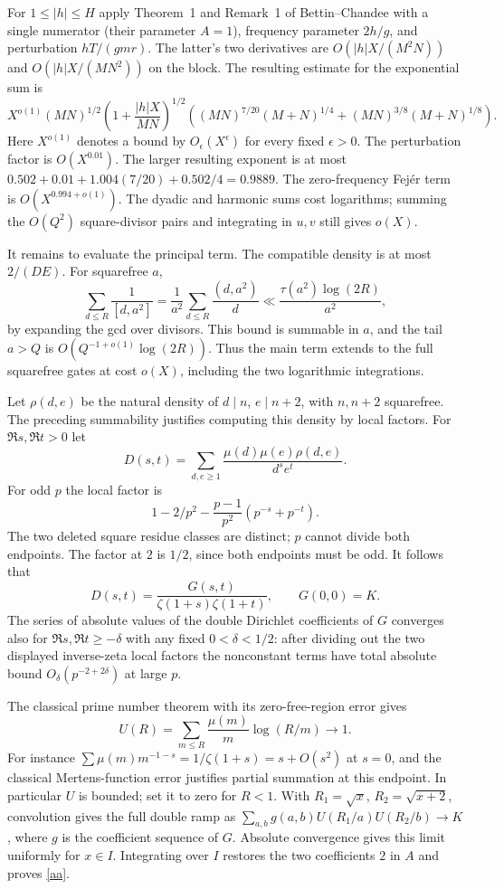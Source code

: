 \documentclass[11pt]{article}
\begin{document}
For $1\le |h|\le H$ apply Theorem~1 and Remark~1 of
Bettin--Chandee \cite{BC} with a single numerator (their parameter
$A=1$), frequency parameter $2h/g$, and perturbation $hT/(gmr)$.
The latter's two derivatives are
$O(|h|X/(M^2N))$ and $O(|h|X/(MN^2))$ on the block.
The resulting estimate for the exponential sum is
\[
 X^{o(1)}(MN)^{1/2}
 \left(1+\frac{|h|X}{MN}\right)^{1/2}
 \left((MN)^{7/20}(M+N)^{1/4}
              +(MN)^{3/8}(M+N)^{1/8}\right).
\]
Here $X^{o(1)}$ denotes a bound by $O_\epsilon(X^\epsilon)$
for every fixed $\epsilon>0$. The perturbation factor is
$O(X^{0.01})$. The larger resulting exponent is at most
$0.502+0.01+1.004(7/20)+0.502/4=0.9889$.
The zero-frequency Fej\'er term is $O(X^{0.994+o(1)})$.
The dyadic and harmonic sums cost logarithms; summing the $O(Q^2)$
square-divisor pairs and integrating in $u,v$ still gives $o(X)$.

It remains to evaluate the principal term. The compatible density
is at most $2/(DE)$. For squarefree $a$,
\[
 \sum_{d\le R}\frac1{[d,a^2]}
 =\frac1{a^2}\sum_{d\le R}\frac{(d,a^2)}d
 \ll\frac{\tau(a^2)\log(2R)}{a^2},
\]
by expanding the gcd over divisors. This bound is summable in $a$,
and the tail $a>Q$ is $O(Q^{-1+o(1)}\log(2R))$.
Thus the main term extends to the full squarefree gates at cost
$o(X)$, including the two logarithmic integrations.

Let $\rho(d,e)$ be the natural density of $d\mid n$, $e\mid n+2$,
with $n,n+2$ squarefree. The preceding summability justifies
computing this density by local factors. For $\Re s,\Re t>0$ let
\[
 D(s,t)=\sum_{d,e\ge1}\frac{\mu(d)\mu(e)\rho(d,e)}
                                    {d^s e^t}.
\]
For odd $p$ the local factor is
\[
 1-2/p^2-\frac{p-1}{p^2}(p^{-s}+p^{-t}).
\]
The two deleted square residue classes are distinct; $p$ cannot
divide both endpoints. The factor at $2$ is $1/2$, since both
endpoints must be odd. It follows that
\[
 D(s,t)=\frac{G(s,t)}{\zeta(1+s)\zeta(1+t)},\qquad G(0,0)=K .
\]
The series of absolute values of the double Dirichlet coefficients
of $G$ converges also for $\Re s,\Re t\ge-\delta$ with any fixed
$0<\delta<1/2$: after dividing out the two displayed inverse-zeta
local factors the nonconstant terms have total absolute bound
$O_\delta(p^{-2+2\delta})$ at large $p$.

The classical prime number theorem with its zero-free-region error
gives
\[
 U(R)=\sum_{m\le R}\frac{\mu(m)}m\log(R/m)\longrightarrow1.
\]
For instance $\sum\mu(m)m^{-1-s}=1/\zeta(1+s)=s+O(s^2)$
at $s=0$, and the classical Mertens-function error justifies
partial summation at this endpoint. In particular $U$ is bounded;
set it to zero for $R<1$. With $R_1=\sqrt x$, $R_2=\sqrt{x+2}$,
convolution gives the full double ramp as
$\sum_{a,b}g(a,b)U(R_1/a)U(R_2/b)\to K$, where $g$ is the
coefficient sequence of $G$. Absolute convergence gives this limit
uniformly for $x\in I$. Integrating over $I$ restores the two
coefficients $2$ in $A$ and proves \eqref{aa}.
\end{document}
